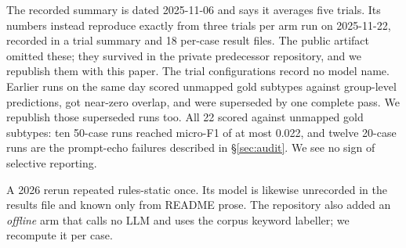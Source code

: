 \documentclass[10pt,twocolumn]{article}
\begin{document}
The recorded summary is dated 2025-11-06 and says it averages five trials. Its
numbers instead reproduce exactly from three trials per arm run on 2025-11-22,
recorded in a trial summary and 18 per-case result files. The public artifact
omitted these; they survived in the private predecessor repository, and we
republish them with this paper. The trial configurations record no model
name. Earlier runs on the same day scored unmapped gold subtypes against
group-level predictions, got near-zero overlap, and were superseded by one complete
pass. We republish those superseded runs too. All 22 scored against unmapped
gold subtypes: ten 50-case runs reached micro-F1 of at most 0.022, and twelve
20-case runs are the prompt-echo failures described in \S\ref{sec:audit}. We see
no sign of selective reporting.

A 2026 rerun repeated rules-static once. Its model is likewise unrecorded in
the results file and known only from README prose. The repository also added an
\emph{offline} arm that calls no LLM and uses the corpus keyword labeller; we
recompute it per case.
\end{document}
